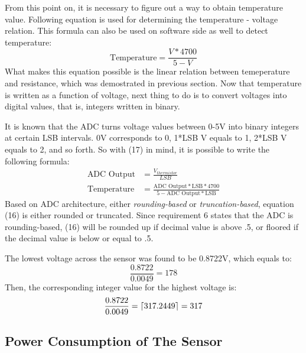 From this point on, it is necessary to figure out a way to obtain temperature value. Following equation is used for determining the temperature - voltage relation. This formula can also be used on software side as well to detect temperature:
\begin{equation}
    \text{Temperature} = \frac{V*4700}{5 - V}
\end{equation}
What makes this equation possible is the linear relation between temeperature and resistance, which was demostrated in previous section. Now that temperature is written as a function of voltage, next thing to do is to convert voltages into digital values, that is, integers written in binary.

It is known that the ADC turns voltage values between 0-5V into binary integers at certain LSB intervals. 0V corresponds to 0, 1*LSB V equals to 1, 2*LSB V equals to 2, and so forth. So with (17) in mind, it is possible to write the following formula:
\begin{align}
    \text{ADC Output} &= \frac{V_{thermistor}}{LSB}\\[3mm]
    \text{Temperature} &= \frac{\text{ADC Output}*\text{LSB}*4700}{5 - \text{ADC Output}*\text{LSB}}
\end{align}
Based on ADC architecture, either \textit{rounding-based} or \textit{truncation-based}, equation (16) is either rounded or truncated. Since requirement 6 states that the ADC is rounding-based, (16) will be rounded up if decimal value is above .5, or floored if the decimal value is below or equal to .5.

The lowest voltage across the sensor was found to be 0.8722V, which equals to:
\begin{equation}
    \frac{0.8722}{0.0049} = 178
\end{equation}
Then, the corresponding integer value for the highest voltage is:
\begin{equation}
    \frac{0.8722}{0.0049} = \ceil*{317.2449}  = 317
\end{equation}
\subsection*{Power Consumption of The Sensor}

